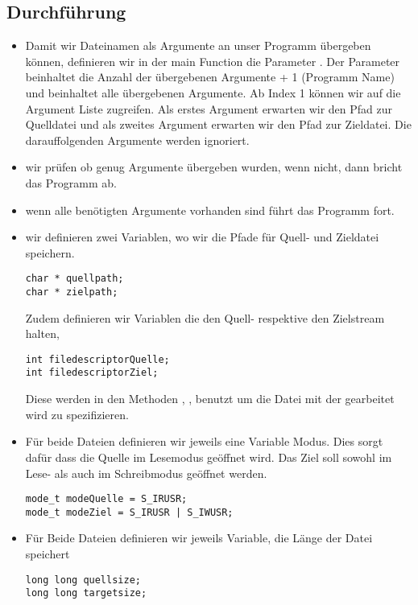 	\subsection{Durchführung}
	\begin{itemize}
		\item Damit wir Dateinamen als Argumente an unser Programm übergeben können, definieren wir in der
		main Function die Parameter . Der Parameter
		 beinhaltet die Anzahl der übergebenen Argumente + 1 (Programm Name) und
		 beinhaltet alle übergebenen Argumente. Ab Index 1 können wir auf die Argument Liste
		zugreifen. Als erstes Argument erwarten wir den Pfad zur Quelldatei und als zweites Argument erwarten wir
	den Pfad zur Zieldatei. Die darauffolgenden Argumente werden ignoriert.
	\item wir prüfen ob genug Argumente übergeben wurden, wenn nicht, dann bricht das Programm ab.
	\item wenn alle benötigten Argumente vorhanden sind führt das Programm fort.
	\item wir definieren zwei Variablen, wo wir die Pfade für Quell- und Zieldatei speichern.
	\begin{lstlisting}
char * quellpath;
char * zielpath;
\end{lstlisting}


Zudem definieren wir Variablen die den Quell- respektive den Zielstream halten,
\begin{lstlisting}
int filedescriptorQuelle;
int filedescriptorZiel;
\end{lstlisting}

Diese werden in den Methoden , ,
 benutzt um die Datei mit der gearbeitet wird zu spezifizieren.

\item Für beide Dateien definieren wir jeweils eine Variable Modus.
Dies sorgt dafür dass die Quelle
im Lesemodus geöffnet wird.
Das Ziel soll sowohl im Lese- als auch im Schreibmodus geöffnet werden.

\begin{lstlisting}
mode_t modeQuelle = S_IRUSR;
mode_t modeZiel = S_IRUSR | S_IWUSR;
\end{lstlisting}

\item Für Beide Dateien definieren wir jeweils Variable, die Länge der Datei speichert
\begin{lstlisting}
long long quellsize;
long long targetsize;
\end{lstlisting}


\end{itemize}
